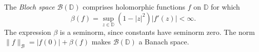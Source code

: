 
The \emph{Bloch space} $\mathcal B(\mathbb D)$ comprises holomorphic functions $f$ on $\mathbb D$ for which
\[
\beta(f)=\sup_{z\in\mathbb D}(1-|z|^2)|f'(z)|<\infty.
\]
The expression $\beta$ is a seminorm, since constants have seminorm zero. The norm $\|f\|_{\mathcal B}=|f(0)|+\beta(f)$ makes $\mathcal B(\mathbb D)$ a Banach space.
